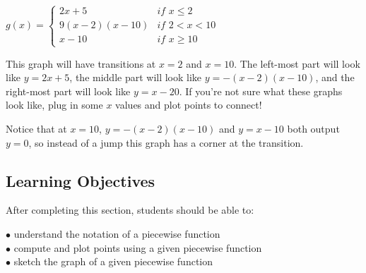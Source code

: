 \documentclass{ximera}
\begin{document}
\begin{example}
$g(x)=\begin{cases} 2x+5 & \textit{if }x\leq 2\\ 9(x-2)(x-10) & \textit{if } 2<x<10\\ x-10 & \textit{if } x\geq 10\end{cases}$

This graph will have transitions at $x=2$ and $x=10$. The left-most part will look like $y=2x+5$, the middle part will look like $y=-(x-2)(x-10)$, and the right-most part will look like $y=x-20$. If you're not sure what these graphs look like, plug in some $x$ values and plot points to connect!


Notice that at $x=10$, $y=-(x-2)(x-10)$ and $y=x-10$ both output $y=0$, so instead of a jump this graph has a corner at the transition.
\end{example}

\subsection*{Learning Objectives}
After completing this section, students should be able to:
\vspace{.05in}

\noindent$\bullet$ understand the notation of a piecewise function
\\$\bullet$ compute and plot points using a given piecewise function
\\$\bullet$ sketch the graph of a given piecewise function
\end{document}
